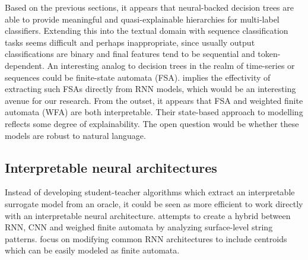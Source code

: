 Based on the previous sections, it appears that neural-backed decision trees are able to provide meaningful and quasi-explainable hierarchies for multi-label classifiers. Extending this into the textual domain with sequence classification tasks seems difficult and perhaps inappropriate, since usually output classifications are binary and final features tend to be sequential and token-dependent. An interesting analog to decision trees in the realm of time-series or sequences could be finite-state automata (FSA). \citet{hou2018learning} implies the effectivity of extracting such FSAs directly from RNN models, which would be an interesting avenue for our research. From the outset, it appears that FSA and weighted finite automata (WFA) are both interpretable. Their state-based approach to modelling reflects some degree of explainability. The open question would be whether these models are robust to natural language.

\subsection{Interpretable neural architectures}

Instead of developing student-teacher algorithms which extract an interpretable surrogate model from an oracle, it could be seen as more efficient to work directly with an interpretable neural architecture. \citet{schwartz2018sopa} attempts to create a hybrid between RNN, CNN and weighed finite automata by analyzing surface-level string patterns. \citet{wang2019state} focus on modifying common RNN architectures to include centroids which can be easily modeled as finite automata. 


